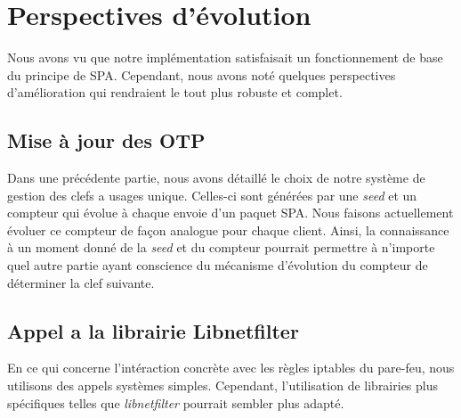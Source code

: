 \chapter{Perspectives d'évolution}

Nous avons vu que notre implémentation satisfaisait un fonctionnement de base du principe de SPA.
Cependant, nous avons noté quelques perspectives d'amélioration qui rendraient le tout plus robuste et complet.

\section{Mise à jour des OTP}
Dans une précédente partie, nous avons détaillé le choix de notre système de gestion des clefs a usages unique. 
Celles-ci sont générées par une \emph{seed} et un compteur qui évolue à chaque envoie d'un paquet SPA.
Nous faisons actuellement évoluer ce compteur de façon analogue pour chaque client.
Ainsi, la connaissance à un moment donné de la \emph{seed} et du compteur pourrait permettre à n'importe quel autre partie ayant conscience du mécanisme d'évolution du compteur de déterminer la clef suivante.

\section{Appel a la librairie Libnetfilter}
En ce qui concerne l'intéraction concrète avec les règles iptables du pare-feu, nous utilisons des appels systèmes simples. Cependant, l'utilisation de librairies plus spécifiques telles que \emph{libnetfilter} pourrait sembler plus adapté.